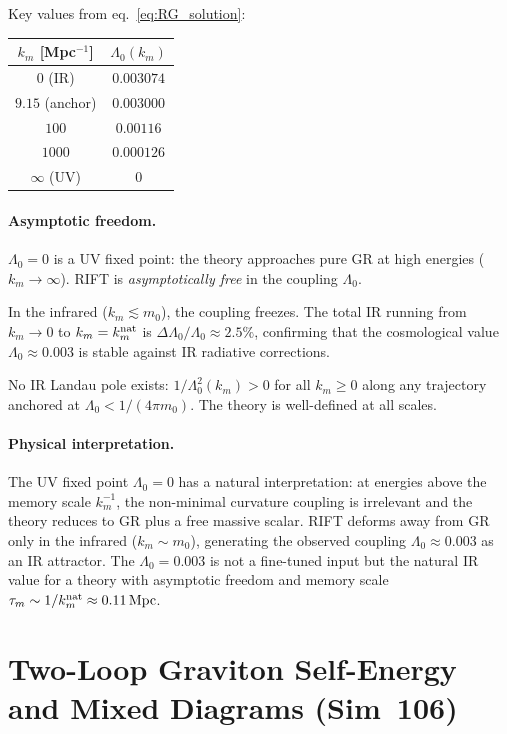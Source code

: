 \documentclass[12pt,a4paper]{article}
\begin{document}
Key values from eq.~\eqref{eq:RG_solution}:

\begin{center}
\begin{tabular}{cc}
\toprule
$k_m$ [Mpc$^{-1}$] & $\Lambda_0(k_m)$ \\
\midrule
$0$  (IR)        & $0.003074$ \\
$9.15$ (anchor)  & $0.003000$ \\
$100$            & $0.00116$  \\
$1000$           & $0.000126$ \\
$\infty$ (UV)    & $0$        \\
\bottomrule
\end{tabular}
\end{center}

\paragraph{Asymptotic freedom.}
$\Lambda_0 = 0$ is a UV fixed point: the theory approaches pure GR at
high energies ($k_m\to\infty$).  RIFT is \emph{asymptotically free} in
the coupling $\Lambda_0$.

In the infrared ($k_m \lesssim m_0$), the coupling freezes.
The total IR running from $k_m\to 0$ to $k_m = k_m^{\rm nat}$ is
$\Delta\Lambda_0/\Lambda_0 \approx 2.5\%$, confirming that the
cosmological value $\Lambda_0\approx 0.003$ is stable against IR
radiative corrections.

No IR Landau pole exists: $1/\Lambda_0^2(k_m)>0$ for all
$k_m\geq 0$ along any trajectory anchored at $\Lambda_0<1/(4\pi m_0)$.
The theory is well-defined at all scales.

\paragraph{Physical interpretation.}
The UV fixed point $\Lambda_0=0$ has a natural interpretation: at
energies above the memory scale $k_m^{-1}$, the non-minimal curvature
coupling is irrelevant and the theory reduces to GR plus a free massive
scalar.  RIFT deforms away from GR only in the infrared
($k_m\sim m_0$), generating the observed coupling $\Lambda_0\approx 0.003$
as an IR attractor.  The $\Lambda_0 = 0.003$ is not a fine-tuned
input but the natural IR value for a theory with asymptotic freedom
and memory scale $\tau_m\sim 1/k_m^{\rm nat} \approx 0.11\,\mathrm{Mpc}$.

\section{Two-Loop Graviton Self-Energy and Mixed Diagrams (Sim~106)}
\label{sec:sim106}
\end{document}
